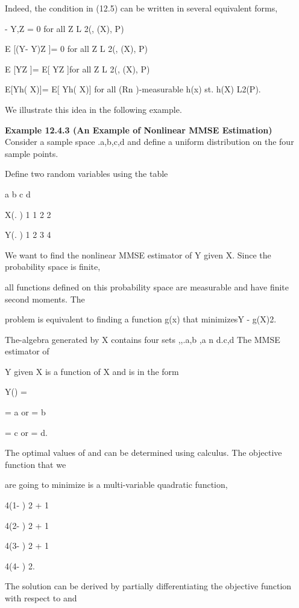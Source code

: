 {Indeed, the condition in (12.5) can be written in several equivalent forms,

\langleY- Y,Z \rangle= 0 for all Z \in L 2(\Omega, \sigma(X), P)

E [(Y- Y)Z ]= 0 for all Z \in L 2(\Omega, \sigma(X), P)

E [YZ ]= E[ YZ ]for all Z \in L 2(\Omega, \sigma(X), P)

E[Yh( X)]= E[ Yh( X)] for all (Rn )-measurable h(x) st. h(X) \in L2(P).

We illustrate this idea in the following example.

\textbf{Example 12.4.3 (An Example of Nonlinear MMSE Estimation)} \\

Consider a sample space .{a,b,c,d } and define a uniform distribution on the four sample points.

Define two random variables using the table

a b c d

X(. ) 1 1 2 2

Y(. ) 1 2 3 4

We want to find the nonlinear MMSE estimator of Y given X. Since the probability space is finite,

all functions defined on this probability space are measurable and have finite second moments. The

problem is equivalent to finding a function g(x) that minimizesY - g(X)2.

The\sigma-algebra generated by X contains four sets \emptyset,\Omega ,.{a,b },a n d.{c,d }The MMSE estimator of

Y given X is a function of X and is in the form

Y() =

{

\alphaif = a or = b

\betaif = c or = d.

The optimal values of \alpha and \beta can be determined using calculus. The objective function that we

are going to minimize is a multi-variable quadratic function,

4(1- \alpha) 2 + 1

4(2- \alpha) 2 + 1

4(3- \beta) 2 + 1

4(4- \beta) 2.

The solution can be derived by partially differentiating the objective function with respect to \alpha and

}}
